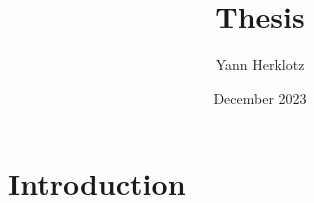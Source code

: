 \documentclass{article}
\title{Thesis}
\author{Yann Herklotz}
\date{December 2023}
\begin{document}
\maketitle

\section{Introduction}
\end{document}
